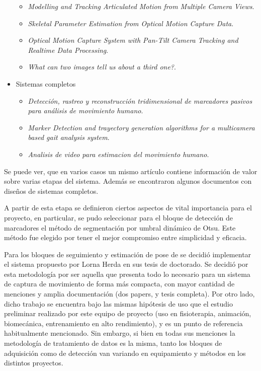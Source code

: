 \begin{itemize}
\begin{itemize}
		\item \emph{Modelling and Tracking Articulated Motion from Multiple Camera Views}.
		\item \emph{Skeletal Parameter Estimation from Optical Motion Capture Data}.
		\item \emph{Optical Motion Capture System with Pan-Tilt Camera Tracking and  Realtime Data Processing}.
		\item \emph{What can two images tell us about a third one?}.
	\end{itemize}
	\item Sistemas completos
	\begin{itemize}
		\item \emph{Detección, rastreo y reconstrucción tridimensional de marcadores pasivos para análisis de movimiento humano}.
		\item \emph{Marker Detection and trayectory generation algorithms for a multicamera based gait analysis system}.
		\item \emph{Analisis de video para estimacion del movimiento humano}.
	\end{itemize}
\end{itemize}

Se puede ver, que en varios casos un mismo artículo contiene información de valor sobre varias etapas del sistema. Además se encontraron algunos documentos con diseños de sistemas completos.

A partir de esta etapa se definieron ciertos aspectos de vital importancia para el proyecto, en particular, se pudo seleccionar para el bloque de detección de marcadores el método de segmentación por umbral dinámico de Otsu\cite{otsu}. Este método fue elegido por tener el mejor compromiso entre simplicidad y eficacia.

Para los bloques de seguimiento y estimación de pose de se decidió implementar el sistema propuesto por Lorna Herda en sus tesis de doctorado\cite{herda}. Se decidió por esta metodología por ser aquella que presenta todo lo necesario para un sistema de captura de movimiento de forma más compacta, con mayor cantidad de menciones y amplia documentación (dos papers, y tesis completa). Por otro lado, dicho trabajo se encuentra bajo las mismas hipótesis de uso que el estudio preliminar realizado por este equipo de proyecto (uso en fisioterapia, animación, biomecánica, entrenamiento en alto rendimiento), y es un punto de referencia habitualmente mencionado. Sin embargo, si bien en todas sus menciones la metodología de tratamiento de datos es la misma, tanto los bloques de adquisición como de detección van variando en equipamiento y métodos en los distintos proyectos.